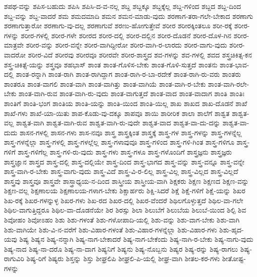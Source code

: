 {ಶಪಥ-ವನ್ನು
ಶಪಿಸ-ಬಹುದು
ಶಪಿಸಿ
ಶಪಿಸಿ-ದ-ವ-ನಲ್ಲ
ಶಬ್ದ
ಶಬ್ದಕ್ಕೂ
ಶಬ್ದಕ್ಕೆಲ್ಲ
ಶಬ್ದ-ಗಳಿಂದ
ಶಬ್ದದ
ಶಬ್ದ-ದಿಂದ
ಶಬ್ದ-ವನ್ನು
ಶಬ್ದ-ವಾದರೆ
ಶಮ
ಶಮದಮಾದಿ
ಶಮನ
ಶಮನ-ಮಾಡು-ವುದು
ಶರಣಾಗ-ತರಾ-ಗಲೇ-ಬೇಕಾದ
ಶರಣಾಗು
ಶರಣಾಗುತ್ತಾರೋ
ಶರಣಾಗು-ವು-ದಲ್ಲ
ಶರಣಾಗುವೆ
ಶರಣು-ಹೋಗುತ್ತೇವೆ
ಶರೀರ
ಶರೀರಕ್ಕಿಂತಲೂ
ಶರೀ-ರಕ್ಕೆ
ಶರೀರ-ಗಳನ್ನು
ಶರೀರ-ಗಳಲ್ಲಿ
ಶರೀರ-ಗಳೇ
ಶರೀರದ
ಶರೀರ-ದಲ್ಲಿ
ಶರೀರ-ದಲ್ಲಿನ
ಶರೀರ-ದೊಡನೆ
ಶರೀರ-ದೊಳ-ಗಿನ
ಶರೀರ-ಮಾತ್ರವೇ
ಶರೀರ-ವನ್ನು
ಶರೀರ-ವನ್ನೇ
ಶರೀರ-ವಾಗಿದ್ದೀರೋ
ಶರೀರ-ವಾಗಿ-ರ-ಲಾರದು
ಶರೀರ-ವಾಗು-ವುದು
ಶರೀರ-ವಾದರೋ
ಶರೀರ-ವಿದೆ
ಶರೀರವು
ಶರೀರವೂ
ಶರೀರವೇ
ಶರೀರ-ಶಾಸ್ತ್ರದ
ಶವ-ಗಳನ್ನು
ಶವ-ಗಳಲ್ಲಿ
ಶವದ
ಶಸ್ತ್ರಚಿಕಿತ್ಸ-ಕನ
ಶಸ್ತ್ರ-ಚಿಕಿತ್ಸೆ-ಯನ್ನು
ಶಸ್ತ್ರವೂ
ಶಹಭಾಸ್
ಶಾಂತ
ಶಾಂತ-ಗೊಳಿಸ-ಬೇಕು
ಶಾಂತ-ಗೊಳಿ-ಸುತ್ತದೆ
ಶಾಂತನು
ಶಾಂತ-ಭಾವ-ದಲ್ಲಿ
ಶಾಂತ-ರನ್ನಾಗಿ
ಶಾಂತ-ರಾಗಿ
ಶಾಂತ-ರಾಗಿದ್ದಾಗ
ಶಾಂತ-ರಾಗಿ-ರ-ಬಾ-ರದೇಕೆ
ಶಾಂತ-ರಾಗಿ-ರು-ವರು
ಶಾಂತರು
ಶಾಂತರೂ
ಶಾಂತ-ವಾಗಲಿ
ಶಾಂತ-ವಾಗಿ
ಶಾಂತ-ವಾಗಿತ್ತು
ಶಾಂತ-ವಾಗಿಯೆ
ಶಾಂತ-ವಾಗಿ-ರ-ಬೇಕು
ಶಾಂತ-ವಾಗಿ-ರಲೇ-ಬೇಕು
ಶಾಂತ-ವಾಗಿ-ರುವ
ಶಾಂತ-ವಾಗಿ-ರು-ವುದು
ಶಾಂತ-ವಾಗುತ್ತದೆ
ಶಾಂತ-ವಾದ
ಶಾಂತ-ವಾದಾಗ
ಶಾಂತಿ
ಶಾಂತಿಃ
ಶಾಂತಿಗೆ
ಶಾಂತಿ-ಭಂಗ
ಶಾಂತಿಯ
ಶಾಂತಿ-ಯನ್ನು
ಶಾಂತಿ-ಯಿಂದ
ಶಾಂತಿ-ಯಿಲ್ಲ
ಶಾಖ
ಶಾಖದ
ಶಾಖ-ದೊಡನೆ
ಶಾಖೆ
ಶಾಖೆ-ಗಳು
ಶಾಖೆ-ಯಾ-ಯಿತು
ಶಾಪ-ಕೊಡು-ವು-ದಕ್ಕೂ
ಶಾಪವೂ
ಶಾಯಿ
ಶಾರೀರಿಕ
ಶಾಲಾ
ಶಾಲೆಗೆ
ಶಾಶ್ವತ
ಶಾಶ್ವತ-ವಲ್ಲ
ಶಾಶ್ವತ-ವಾಗಿ
ಶಾಶ್ವತ-ವಾಗಿ-ರುವ
ಶಾಶ್ವತ-ವಾಗಿ-ರು-ವುದೇ
ಶಾಶ್ವತ-ವಾದ
ಶಾಶ್ವತ-ವಾ-ದು-ದನ್ನು
ಶಾಶ್ವತ-ವಾ-ದುದು
ಶಾಸನ-ಗಳಲ್ಲಿ
ಶಾಸನ-ಗಳು
ಶಾಸ-ನವೂ
ಶಾಸ್ತ್ರ
ಶಾಸ್ತ್ರಕ್ಕಿಂತ
ಶಾಸ್ತ್ರಕ್ಕೆ
ಶಾಸ್ತ್ರ-ಗಳ
ಶಾಸ್ತ್ರ-ಗಳನ್ನು
ಶಾಸ್ತ್ರ-ಗಳನ್ನೆಲ್ಲ
ಶಾಸ್ತ್ರ-ಗಳನ್ನೆಲ್ಲಾ
ಶಾಸ್ತ್ರ-ಗಳಲ್ಲಿ
ಶಾಸ್ತ್ರ-ಗಳಲ್ಲೆಲ್ಲ
ಶಾಸ್ತ್ರ-ಗಳಾವುವೂ
ಶಾಸ್ತ್ರ-ಗಳಿಂದ
ಶಾಸ್ತ್ರ-ಗಳಿ-ಗಿಂತ
ಶಾಸ್ತ್ರ-ಗಳಿಗೂ
ಶಾಸ್ತ್ರ-ಗಳಿಗೆ
ಶಾಸ್ತ್ರ-ಗಳಿಗೆಲ್ಲ
ಶಾಸ್ತ್ರ-ಗಳಿ-ರು-ವುದು
ಶಾಸ್ತ್ರ-ಗಳು
ಶಾಸ್ತ್ರ-ಗಳೂ
ಶಾಸ್ತ್ರ-ಗಳೊಂದಿಗೆ
ಶಾಸ್ತ್ರಜ್ಞನು
ಶಾಸ್ತ್ರಜ್ಞರು
ಶಾಸ್ತ್ರಜ್ಞಾನ
ಶಾಸ್ತ್ರದ
ಶಾಸ್ತ್ರ-ದಲ್ಲಿ
ಶಾಸ್ತ್ರ-ದಲ್ಲಿಯೇ
ಶಾಸ್ತ್ರ-ದಿಂದ
ಶಾಸ್ತ್ರ-ಭಾಗದ
ಶಾಸ್ತ್ರ-ವನ್ನು
ಶಾಸ್ತ್ರ-ವನ್ನೂ
ಶಾಸ್ತ್ರ-ವನ್ನೇ
ಶಾಸ್ತ್ರ-ವಾಗಿ-ರ-ಬೇಕು
ಶಾಸ್ತ್ರ-ವಾಗು-ವುದು
ಶಾಸ್ತ್ರ-ವಿದೆ
ಶಾಸ್ತ್ರ-ವಿ-ರ-ಲಿಲ್ಲ
ಶಾಸ್ತ್ರ-ವಿಲ್ಲ
ಶಾಸ್ತ್ರ-ವಿಲ್ಲದ
ಶಾಸ್ತ್ರ-ವಿಲ್ಲದೆ
ಶಾಸ್ತ್ರವು
ಶಾಸ್ತ್ರವೂ
ಶಾಸ್ತ್ರವೇ
ಶಾಸ್ತ್ರಾಧ್ಯಯ-ನ-ದಿಂದ
ಶಾಸ್ತ್ರೀಯ
ಶಾಸ್ತ್ರೀಯ-ವಾಗಿ
ಶಿಕ್ಷಕರು
ಶಿಕ್ಷಣ
ಶಿಕ್ಷಣದ
ಶಿಕ್ಷಣ-ವನ್ನು
ಶಿಕ್ಷಣ-ವಲ್ಲ
ಶಿಕ್ಷಣಾಲಯ
ಶಿಕ್ಷಣಾಲಯ-ಗಳಾಗ-ಬೇಕು
ಶಿಕ್ಷಾರ್ಹರು
ಶಿಕ್ಷಿ-ಸಿದರೆ
ಶಿಕ್ಷೆ
ಶಿಕ್ಷೆ-ಗಳಿಗೆ
ಶಿಕ್ಷೆ-ಯನ್ನು
ಶಿಖರ
ಶಿಖ-ರಕ್ಕೆ
ಶಿಖರ-ಗಳನ್ನುಳ್ಳ
ಶಿಖರ-ಗಳು
ಶಿಖ-ರದ
ಶಿಖರ-ದಲ್ಲಿ
ಶಿಖರ-ವೆಂದರೆ
ಶಿಥಿಲಗೊಳ್ಳುತ್ತದೆ
ಶಿಥಿಲ-ವಾ-ಗಲೇ
ಶಿಥಿಲ-ವಾಗುತ್ತಿದ್ದರೂ
ಶಿಥಿಲ-ವಾ-ದೊಡನೆಯೇ
ಶಿರ
ಶಿರಸ್ಸು
ಶಿಲಾ
ಶಿಲುಬೆಗೆ
ಶಿಲುಬೆಯ
ಶಿಲುಬೆ-ಯಿಂದ
ಶಿಲ್ಪಿ
ಶಿವ
ಶಿವೋಹಂ
ಶಿವೋಽಹಂ
ಶಿಶು
ಶಿಶು-ಗಳಂತೆ
ಶಿಶು-ಗಳೋಪಾದಿ-ಯಲ್ಲಿ
ಶಿಶು-ವನ್ನು
ಶಿಶು-ವಾಗ-ಬೇಕು
ಶಿಶು-ವಾಗಿ
ಶಿಶು-ವಾಗಿಯೇ
ಶಿಶು-ವಿ-ನ-ವರೆಗೆ
ಶಿಶು-ವಿಹಾರ-ಗಳಂತೆ
ಶಿಶು-ವಿಹಾರ-ಗಳನ್ನೆಲ್ಲಾ
ಶಿಶು-ವಿಹಾರ-ಗಳು
ಶಿಶು-ಹೃದ-ಯವು
ಶಿಷ್ಯ
ಶಿಷ್ಯನ
ಶಿಷ್ಯ-ನನ್ನಾಗಿ
ಶಿಷ್ಯ-ನಾಗ-ಬೇಕಾದರೆ
ಶಿಷ್ಯ-ನಾಗ-ಬೇಕೆಂದು
ಶಿಷ್ಯ-ನಾಗಿ-ರ-ಬೇಕು
ಶಿಷ್ಯ-ನಾಗು-ವುದು
ಶಿಷ್ಯ-ನಾದ
ಶಿಷ್ಯ-ನಾ-ದರೊ
ಶಿಷ್ಯ-ನಾ-ದಾಗ
ಶಿಷ್ಯನಿಗೆ
ಶಿಷ್ಯನು
ಶಿಷ್ಯ-ನೊಬ್ಬನು
ಶಿಷ್ಯರ
ಶಿಷ್ಯ-ರನ್ನು
ಶಿಷ್ಯ-ರಾಗಲು
ಶಿಷ್ಯ-ರಾಗುವಿರಿ
ಶಿಷ್ಯ-ರಿಗೆ
ಶಿಷ್ಯರು
ಶಿಸ್ತನ್ನು
ಶಿಸ್ತು
ಶೀಘ್ರಲಿಪಿ
ಶೀಘ್ರಲಿ-ಪಿ-ಯಲ್ಲಿ
ಶೀಘ್ರ-ವಾಗಿ
ಶೀತಲ-ಕರ-ಗಳು
ಶೀತೋಷ್ಟ-ಗಳನ್ನು
}
